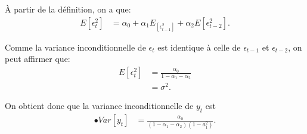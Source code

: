 \begin{exercice}
\begin{sol}
À partir de la définition, on a que:
\begin{align*}
E[\epsilon_t^2] &= \alpha_0 + \alpha_1 E_[\epsilon_{t-1}^2] + \alpha_2 E[\epsilon_{t-2}^2].
\end{align*}

Comme la variance inconditionnelle de $\epsilon_t$ est identique à celle de $\epsilon_{t-1}$ et $\epsilon_{t-2}$, on peut affirmer que:
\begin{align*}
E[\epsilon_t^2] &= \frac{\alpha_0}{1-\alpha_1-\alpha_2} \\
&= \sigma^2.
\end{align*}

On obtient donc que la variance inconditionnelle de $y_t$ est
\begin{align*}
•Var[y_t] &= \frac{\alpha_0}{(1-\alpha_1-\alpha_2)(1-a_1^2)}.
\end{align*}
\end{sol}
\end{exercice}


